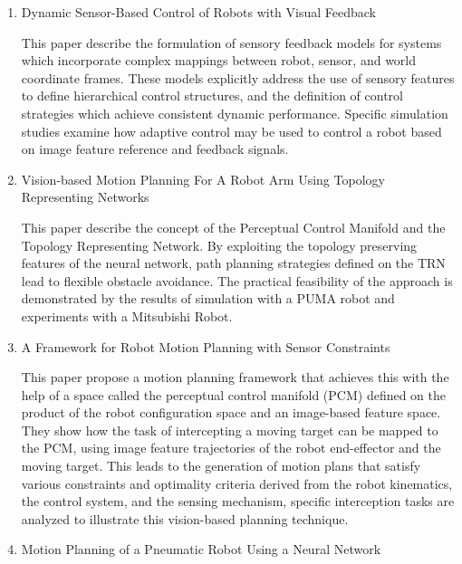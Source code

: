 \documentclass[10pt,twocolumn,letterpaper]{article}
\begin{document}
\begin{enumerate}
\item Dynamic Sensor-Based Control of Robots with Visual Feedback

This paper describe the formulation of sensory feedback models for systems which incorporate complex mappings between robot, sensor, and world coordinate frames. These models explicitly address the use of sensory features to define hierarchical control structures, and the definition of control strategies which achieve consistent dynamic performance. Specific simulation studies examine how adaptive control may be used to control a robot based on image feature reference and feedback signals. 

\item Vision-based Motion Planning For A Robot Arm Using Topology Representing Networks

This paper describe the concept of the Perceptual Control Manifold and the Topology Representing Network. By exploiting the topology preserving features of the neural network, path planning strategies defined on the TRN lead to flexible obstacle avoidance. The practical feasibility of the approach is demonstrated by the results of simulation with a PUMA robot and experiments with a Mitsubishi Robot. 

\item A Framework for Robot Motion Planning with Sensor Constraints

This paper propose a motion planning framework that achieves this with the help of a space called the perceptual control manifold (PCM) defined on the product of the robot configuration space and an image-based feature space. They show how the task of intercepting a moving target can be mapped to the PCM, using image feature trajectories of the robot end-effector and the moving target. This leads to the generation of motion plans that satisfy various constraints and optimality criteria derived from the robot kinematics, the control system, and the sensing mechanism, specific interception tasks are analyzed to illustrate this vision-based planning technique. 

\item Motion Planning of a Pneumatic Robot Using a Neural Network


\end{enumerate}
\end{document}
